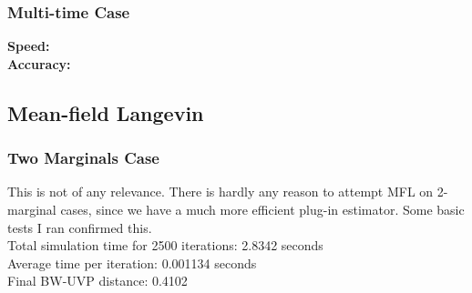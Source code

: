 \documentclass{article}
\begin{document}
\subsubsection{Multi-time Case }
\textbf{Speed:}\\
\textbf{Accuracy:}
\subsection{Mean-field Langevin}
\subsubsection{Two Marginals Case}
This is not of any relevance. There is hardly any reason to attempt MFL on 2-marginal cases, since we have a much more efficient plug-in estimator. Some basic tests I ran confirmed this.\\
Total simulation time for 2500 iterations: 2.8342 seconds\\
Average time per iteration: 0.001134 seconds\\
Final BW-UVP distance: 0.4102
\end{document}
